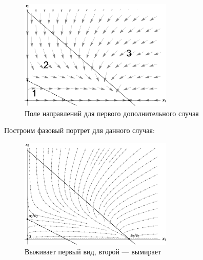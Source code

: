 \documentclass[12pt,a4paper]{article}
\begin{document}

    
    \begin{figure}[h]
        \centering
        \includegraphics[width=0.65\textwidth]{areas_3.pdf}
        \caption{Поле направлений для первого дополнительного случая}
        \label{fig:areas_3}
    \end{figure}

    \pagebreak

    Построим фазовый портрет для данного случая:
    \begin{figure}[h]
        \centering
        \includegraphics[width=0.65\textwidth]{phase_3.pdf}
        \caption{Выживает первый вид, второй --- вымирает}
        \label{fig:phase_3}
    \end{figure}
    
\end{document}
